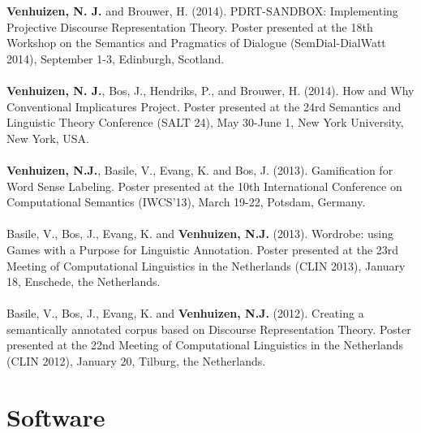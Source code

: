 \documentclass[a4paper,10pt]{article}
\begin{document}
\noindent
    \textbf{Venhuizen, N. J.} and Brouwer, H. (2014). PDRT-SANDBOX:
    Implementing Projective Discourse Representation Theory. Poster
    presented at the 18th Workshop on the Semantics and Pragmatics of
    Dialogue (SemDial-DialWatt 2014), September 1-3, Edinburgh, Scotland.\\
    \\
    \textbf{Venhuizen, N. J.}, Bos, J., Hendriks, P., and Brouwer, H.
    (2014). How and Why Conventional Implicatures Project. Poster presented
    at the 24rd Semantics and Linguistic Theory Conference (SALT 24), May
    30-June 1, New York University, New York, USA.\\
    \\
    \textbf{Venhuizen, N.J.}, Basile, V., Evang, K. and Bos, J. (2013).
    Gamification for Word Sense Labeling. Poster presented at the 10th
    International Conference on Computational Semantics (IWCS'13), March
    19-22, Potsdam, Germany.\\
    \\
    Basile, V., Bos, J., Evang, K. and \textbf{Venhuizen, N.J.} (2013).
    Wordrobe: using Games with a Purpose for Linguistic Annotation. Poster
    presented at the 23rd Meeting of Computational Linguistics in the
    Netherlands (CLIN 2013), January 18, Enschede, the Netherlands.\\
    \\
    Basile, V., Bos, J., Evang, K. and \textbf{Venhuizen, N.J.} (2012).
    Creating a semantically annotated corpus based on Discourse
    Representation Theory. Poster presented at the 22nd Meeting of
    Computational Linguistics in the Netherlands (CLIN 2012), January 20,
    Tilburg, the Netherlands.


\section*{Software}
\end{document}
